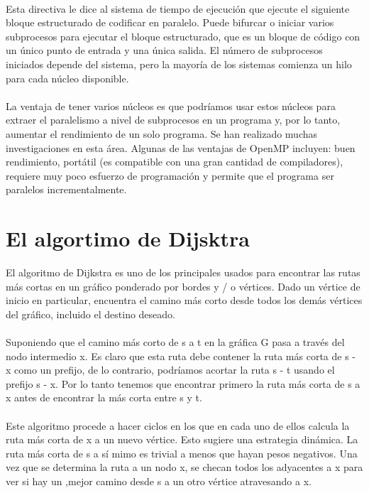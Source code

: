 \documentclass[11pt]{article}
\begin{document}
\paragraph{}
Esta directiva le dice al sistema de tiempo de ejecución que ejecute el siguiente bloque estructurado de codificar en paralelo. Puede bifurcar o iniciar varios subprocesos para ejecutar el bloque estructurado, que es un bloque de código con un único punto de entrada y una única salida. El número de subprocesos iniciados depende del sistema, pero la mayoría de los sistemas
comienza un hilo para cada núcleo disponible.

\paragraph{}
La ventaja de tener varios núcleos es que podríamos usar estos núcleos para extraer el paralelismo a nivel de subprocesos en un programa y, por lo tanto, aumentar el rendimiento de un solo programa. Se han realizado muchas investigaciones en esta área. Algunas de las ventajas de OpenMP incluyen: buen rendimiento, portátil (es compatible con una gran cantidad de compiladores), requiere muy poco esfuerzo de programación y permite que el programa ser paralelos incrementalmente.
\section{El algortimo de Dijsktra}
El algoritmo de Dijkstra es uno de los principales usados para encontrar las rutas más cortas en un gráfico ponderado por bordes y / o vértices. Dado un vértice de inicio en particular, encuentra el camino más corto desde todos los demás vértices del gráfico, incluido el destino deseado. 

\paragraph{}
Suponiendo que el camino más corto de s a t en la gráfica G pasa a través del nodo intermedio x. Es claro que esta ruta debe contener la ruta más corta de s - x como un prefijo, de lo contrario, podríamos acortar la ruta s - t usando el prefijo s - x. Por lo tanto tenemos que encontrar primero la ruta más corta de s a x antes de encontrar la más corta entre s y t. 

\paragraph{}
Este algoritmo procede a hacer ciclos en los que en cada uno de ellos calcula la ruta más corta de x a un nuevo vértice. Esto sugiere una estrategia dinámica. La ruta más corta de s a sí mimo es trivial a menos que hayan pesos negativos. Una vez que se determina la ruta a un nodo x, se checan todos los adyacentes a x para ver si hay un ,mejor camino desde s a un otro vértice atravesando a x.
\end{document}
